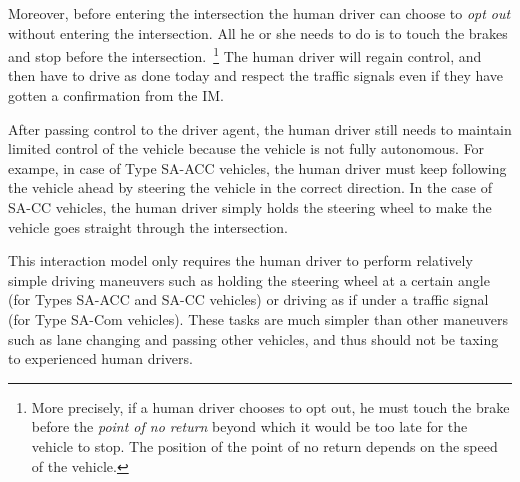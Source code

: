 
Moreover, before entering the intersection the human driver can
choose to \emph{opt out} without entering the intersection.  All he or she 
needs to do is to touch the brakes and stop before the
intersection.~\footnote{More precisely, if a human driver chooses to
opt out, he must touch the brake before the \emph{point of no return}
beyond which it would be too late for the vehicle to stop.  The
position of the point of no return depends on the speed of the
vehicle.}  The human driver will regain control, and then have to
drive as done today and respect the traffic signals even if they
have gotten a confirmation from the IM.

After passing control to the driver agent, the human driver still
needs to maintain limited control of the vehicle because the vehicle
is not fully autonomous.  For exampe, in
case of Type SA-ACC vehicles, the human driver must keep following the
vehicle ahead by steering the vehicle in the correct direction.
In the case of SA-CC
vehicles, the human driver simply holds the steering wheel to make the
vehicle goes straight through the intersection.

This interaction model only requires the human driver to perform
relatively simple driving maneuvers such as holding the steering wheel
at a certain angle (for Types SA-ACC and SA-CC vehicles) or
driving as if under a traffic signal (for Type SA-Com vehicles).
These tasks are much simpler than other maneuvers such as lane
changing and passing other vehicles, and thus should not be taxing to experienced human drivers.  


